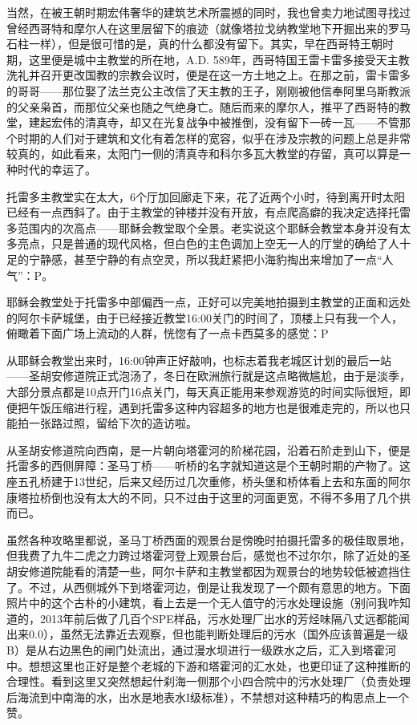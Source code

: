 \documentclass[
]{book}
\begin{document}
当然，在被王朝时期宏伟奢华的建筑艺术所震撼的同时，我也曾卖力地试图寻找过曾经西哥特和摩尔人在这里层留下的痕迹（就像塔拉戈纳教堂地下开掘出来的罗马石柱一样），但是很可惜的是，真的什么都没有留下。其实，早在西哥特王朝时期，这里便是城中主教堂的所在地，A.D. 589年，西哥特国王雷卡雷多接受天主教洗礼并召开更改国教的宗教会议时，便是在这一方土地之上。在那之前，雷卡雷多的哥哥------那位娶了法兰克公主改信了天主教的王子，刚刚被他信奉阿里乌斯教派的父亲枭首，而那位父亲也随之气绝身亡。随后而来的摩尔人，推平了西哥特的教堂，建起宏伟的清真寺，却又在光复战争中被推倒，没有留下一砖一瓦------不管那个时期的人们对于建筑和文化有着怎样的宽容，似乎在涉及宗教的问题上总是非常较真的，如此看来，太阳门一侧的清真寺和科尔多瓦大教堂的存留，真可以算是一种时代的幸运了。

托雷多主教堂实在太大，6个厅加回廊走下来，花了近两个小时，待到离开时太阳已经有一点西斜了。由于主教堂的钟楼并没有开放，有点爬高癖的我决定选择托雷多范围内的次高点------耶稣会教堂取个全景。老实说这个耶稣会教堂本身并没有太多亮点，只是普通的现代风格，但白色的主色调加上空无一人的厅堂的确给了人十足的宁静感，甚至宁静的有点空灵，所以我赶紧把小海豹掏出来增加了一点``人气''：P。

耶稣会教堂处于托雷多中部偏西一点，正好可以完美地拍摄到主教堂的正面和远处的阿尔卡萨城堡，由于已经接近教堂16:00关门的时间了，顶楼上只有我一个人，俯瞰着下面广场上流动的人群，恍惚有了一点卡西莫多的感觉：P

从耶稣会教堂出来时，16:00钟声正好敲响，也标志着我老城区计划的最后一站------圣胡安修道院正式泡汤了，冬日在欧洲旅行就是这点略微尴尬，由于是淡季，大部分景点都是10点开门16点关门，每天真正能用来参观游览的时间实际很短，即便把午饭压缩进行程，遇到托雷多这种内容超多的地方也是很难走完的，所以也只能拍一张路过照，留给下次的造访啦。

从圣胡安修道院向西南，是一片朝向塔霍河的阶梯花园，沿着石阶走到山下，便是托雷多的西侧屏障：圣马丁桥------听桥的名字就知道这是个王朝时期的产物了。这座五孔桥建于13世纪，后来又经历过几次重修，桥头堡和桥体看上去和东面的阿尔康塔拉桥倒也没有太大的不同，只不过由于这里的河面更宽，不得不多用了几个拱而已。

虽然各种攻略里都说，圣马丁桥西面的观景台是傍晚时拍摄托雷多的极佳取景地，但我费了九牛二虎之力跨过塔霍河登上观景台后，感觉也不过尔尔，除了近处的圣胡安修道院能看的清楚一些，阿尔卡萨和主教堂都因为观景台的地势较低被遮挡住了。不过，从西侧城外下到塔霍河边，倒是让我发现了一个颇有意思的地方。下面照片中的这个古朴的小建筑，看上去是一个无人值守的污水处理设施（别问我咋知道的，2013年前后做了几百个SPE样品，污水处理厂出水的芳烃味隔八丈远都能闻出来0.0），虽然无法靠近去观察，但也能判断处理后的污水（国外应该普遍是一级B）是从右边黑色的闸门处流出，通过漫水坝进行一级跌水之后，汇入到塔霍河中。想想这里也正好是整个老城的下游和塔霍河的汇水处，也更印证了这种推断的合理性。看到这里又突然想起什刹海一侧那个小四合院中的污水处理厂（负责处理后海流到中南海的水，出水是地表水I级标准），不禁想对这种精巧的构思点上一个赞。
\end{document}

